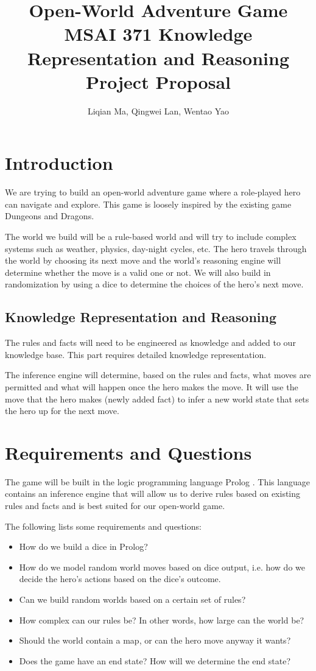 \documentclass[10pt]{article}
\title{
    Open-World Adventure Game \\[.5cm]
    \normalsize MSAI 371 Knowledge Representation and Reasoning Project Proposal
}
\author{Liqian Ma, Qingwei Lan, Wentao Yao}
\begin{document}
\maketitle

\section{Introduction}

We are trying to build an open-world adventure game where a role-played hero can navigate and explore. This game is loosely inspired by the existing game Dungeons and Dragons.

The world we build will be a rule-based world and will try to include complex systems such as weather, physics, day-night cycles, etc. The hero travels through the world by choosing its next move and the world's reasoning engine will determine whether the move is a valid one or not. We will also build in randomization by using a dice to determine the choices of the hero’s next move.

\subsection*{Knowledge Representation and Reasoning}

The rules and facts will need to be engineered as knowledge and added to our knowledge base. This part requires detailed knowledge representation.

The inference engine will determine, based on the rules and facts, what moves are permitted and what will happen once the hero makes the move. It will use the move that the hero makes (newly added fact) to infer a new world state that sets the hero up for the next move.


\section{Requirements and Questions}

The game will be built in the logic programming language Prolog \cite{swiprolog}. This language contains an inference engine that will allow us to derive rules based on existing rules and facts and is best suited for our open-world game.

The following lists some requirements and questions:

\begin{itemize}
\item How do we build a dice in Prolog?
\item How do we model random world moves based on dice output, i.e. how do we decide the hero’s actions based on the dice’s outcome.
\item Can we build random worlds based on a certain set of rules?
\item How complex can our rules be? In other words, how large can the world be?
\item Should the world contain a map, or can the hero move anyway it wants?
\item Does the game have an end state? How will we determine the end state?
\end{itemize}
\end{document}
